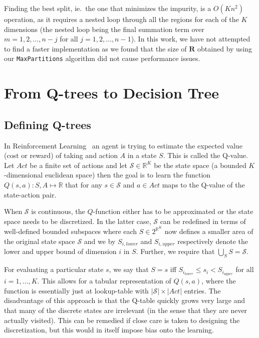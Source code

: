 Finding the best split, ie.\ the one that minimizes the impurity, is a $O(Kn^2)$
operation, as it requires a nested loop through all the regions for each
of the $K $dimensions (the nested loop being the final summation term over $m =
1, 2, \ldots, n - j$ for all $j = 1, 2, \ldots, n - 1$). In this work, we have
not attempted to find a faster implementation as we found that the size of
$\mathbf{R}$ obtained by using our \texttt{MaxPartitions} algorithm did not
cause performance issues.


\section{From Q-trees to Decision Tree}%
\label{sec:convergeToDT}

\subsection{Defining Q-trees}%
\label{subsec:defQTrees}

In Reinforcement Learning~\cite{Sutton1998} an agent is trying to estimate the
expected value (cost or reward) of taking and action $A$ in a state $S$. This is
called the Q-value. Let $Act$ be a finite set of actions and let $\mathcal{S}
\in \mathbb{R}^K$ be the state space (a bounded $K$-dimensional euclidean space)
then the goal is to learn the function $Q(s,a) : S, A \mapsto \mathbb{R}$ that
for any $s \in \mathcal{S}$ and $a \in Act$ maps to the Q-value of the
state-action pair.

When $\mathcal{S}$ is continuous, the $Q$-function either has to be approximated
or the state space needs to be discretized. In the latter case, $\mathcal{S}$
can be redefined in terms of well-defined bounded subspaces where each $S \in
2^{\mathbb{R}^{K}}$ now defines a smaller area of the original state space
$\mathcal{S}$ and we by $S_{i,lower}$ and $S_{i,upper}$ respectively denote the lower and
upper bound of dimension $i$ in $S$. Further, we require that $\bigcup_S S =
\mathcal{S}$.

For evaluating a particular state $s$, we say that $S = s$ iff $S_{i_{lower}}
\le s_i < S_{i_{upper}}$ for all $i = 1, \ldots, K$.  This allows for a tabular
representation of $Q(s,a)$, where the function is essentially just at
lookup-table with $|\mathcal{S}| \times |Act|$ entries. The disadvantage
of this approach is that the Q-table quickly grows very large and that many of
the discrete states are irrelevant (in the sense that they are never actually
visited). This can be remedied if close care is taken to designing the
discretization, but this would in itself impose bias onto the learning.

